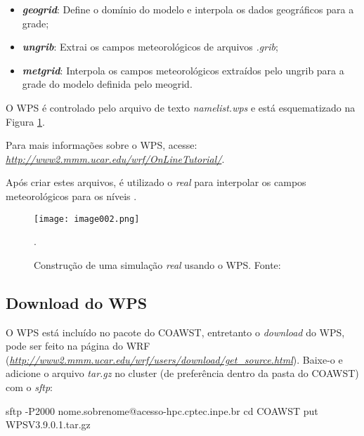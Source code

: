 \begin{itemize}
\item \textbf{\textit{geogrid}}: Define o domínio do modelo e interpola os dados geográficos para a grade;
\item \textbf{\textit{ungrib}}: Extrai os campos meteorológicos de arquivos \textit{.grib};
\item \textbf\textit{{metgrid}}: Interpola os campos meteorológicos extraídos pelo ungrib para a grade do modelo definida pelo meogrid.
\end{itemize}
\bigskip

\noindent O WPS é controlado pelo arquivo de texto \textit{namelist.wps} e está esquematizado na Figura \textcolor{bleu_cite}{\ref{wpsdetalha}}.
\bigskip

\noindent Para mais informações sobre o WPS, acesse:  \textcolor{bleu_cite}{\href{http://www2.mmm.ucar.edu/wrf/OnLineTutorial/}{\textit{http://www2.mmm.ucar.edu/wrf/OnLineTutorial/}}}.
\bigskip

\noindent Após criar estes arquivos, é utilizado o \textit{real} para interpolar os campos meteorológicos para os níveis \texteta.
\bigskip

\begin{figure}[H]
    \centering
    \captionsetup{justification=centering}
    \texttt{[image: image002.png]}
    \caption{Construção de uma simulação \textit{real} usando o WPS. \newline Fonte: \textcite{duda2006}}.
    \label{wpsdetalha}
\end{figure}
\bigskip

\subsection{Download do WPS}
\bigskip

\noindent O WPS está incluído no pacote do COAWST, entretanto o \textit{download} do WPS, pode ser feito na página do WRF (\textcolor{bleu_cite}{\href{http://www2.mmm.ucar.edu/wrf/users/download/get\_source.html}{\textit{http://www2.mmm.ucar.edu/wrf/users/download/get\_source.html}}}). Baixe-o e adicione o arquivo \textit{tar.gz} no cluster (de preferência dentro da pasta do COAWST) com o \textit{sftp}:
\bigskip

\begin{bashcode}
sftp -P2000 nome.sobrenome@acesso-hpc.cptec.inpe.br
cd COAWST
put WPSV3.9.0.1.tar.gz
\end{bashcode}
\bigskip

